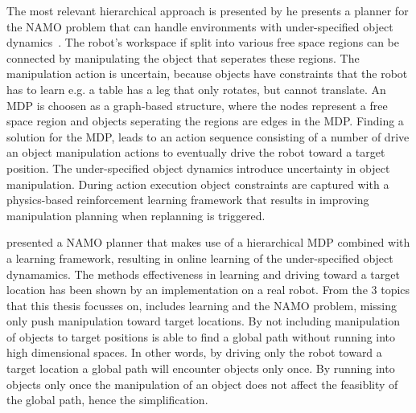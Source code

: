 The most relevant hierarchical approach is presented by \citeauthor{scholz_navigation_2016} he presents a planner for the \ac{NAMO} problem that can handle environments with under-specified object dynamics~\cite{scholz_navigation_2016}. The robot's workspace if split into various free space regions can be connected by manipulating the object that seperates these regions. The manipulation action is uncertain, because objects have constraints that the robot has to learn e.g. a table has a leg that only rotates, but cannot translate. An \ac{MDP} is choosen as a graph-based structure, where the nodes represent a free space region and objects seperating the regions are edges in the \ac{MDP}. Finding a solution for the \ac{MDP}, leads to an action sequence consisting of a number of drive an object manipulation actions to eventually drive the robot toward a target position. The under-specified object dynamics introduce uncertainty in object manipulation. During action execution object constraints are captured with a physics-based reinforcement learning framework that results in improving manipulation planning when replanning is triggered.\bs

\citeauthor{scholz_navigation_2016} presented a \ac{NAMO} planner that makes use of a hierarchical \ac{MDP} combined with a learning framework, resulting in online learning of the under-specified object dynamamics. The methods effectiveness in learning and driving toward a target location has been shown by an implementation on a real robot. From the 3 topics that this thesis focusses on, \citeauthor{scholz_navigation_2016} includes learning and the \ac{NAMO} problem, missing only push manipulation toward target locations. By not including manipulation of objects to target positions \citeauthor{scholz_navigation_2016} is able to find a global path without running into high dimensional spaces. In other words, by driving only the robot toward a target location a global path will encounter objects only once. By running into objects only once the manipulation of an object does not affect the feasiblity of the global path, hence the simplification.\bs


